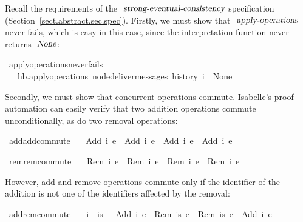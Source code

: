 \noindent 
Recall the requirements of the $\isa{strong-eventual-consistency}$ specification (Section~\ref{sect.abstract.sec.spec}).
Firstly, we must show that $\isa{apply-operations}$ never fails, which is easy in this case, since the interpretation function never returns $\isa{None}$:
\begin{isabelle}
\ apply{\isacharunderscore}operations{\isacharunderscore}never{\isacharunderscore}fails{\isacharcolon}\isanewline
\ \ \ {\isachardoublequoteopen}hb.apply{\isacharunderscore}operations\ {\isacharparenleft}node{\isacharunderscore}deliver{\isacharunderscore}messages\ {\isacharparenleft}history\ i{\isacharparenright}{\isacharparenright}\ {\isasymnoteq}\ None{\isachardoublequoteclose}
\end{isabelle}
\noindent Secondly, we must show that concurrent operations commute.
Isabelle's proof automation can easily verify that two addition operations commute unconditionally, as do two removal operations:
\begin{isabelle}
\ add{\isacharunderscore}add{\isacharunderscore}commute{\isacharcolon}\isanewline
\ \ \ {\isachardoublequoteopen}{\isasymlangle}Add\ i{}\ e{}{\isasymrangle}\ {\isasymrhd}\ {\isasymlangle}Add\ i{}\ e{}{\isasymrangle}\ {\isacharequal}\ {\isasymlangle}Add\ i{}\ e{}{\isasymrangle}\ {\isasymrhd}\ {\isasymlangle}Add\ i{}\ e{}{\isasymrangle}{\isachardoublequoteclose}
\end{isabelle}
\begin{isabelle}
\ rem{\isacharunderscore}rem{\isacharunderscore}commute{\isacharcolon}\isanewline
\ \ \ {\isachardoublequoteopen}{\isasymlangle}Rem\ i{}\ e{}{\isasymrangle}\ {\isasymrhd}\ {\isasymlangle}Rem\ i{}\ e{}{\isasymrangle}\ {\isacharequal}\ {\isasymlangle}Rem\ i{}\ e{}{\isasymrangle}\ {\isasymrhd}\ {\isasymlangle}Rem\ i{}\ e{}{\isasymrangle}{\isachardoublequoteclose}
\end{isabelle}
\noindent However, add and remove operations commute only if the identifier of the addition is not one of the identifiers affected by the removal:
\begin{isabelle}
\ add{\isacharunderscore}rem{\isacharunderscore}commute{\isacharcolon}\isanewline
\ \ \ {\isachardoublequoteopen}i\ {\isasymnotin}\ is{\isachardoublequoteclose}\ \ \ {\isachardoublequoteopen}{\isasymlangle}Add\ i\ e{}{\isasymrangle}\ {\isasymrhd}\ {\isasymlangle}Rem\ is\ e{}{\isasymrangle}\ {\isacharequal}\ {\isasymlangle}Rem\ is\ e{}{\isasymrangle}\ {\isasymrhd}\ {\isasymlangle}Add\ i\ e{}{\isasymrangle}{\isachardoublequoteclose}
\end{isabelle}


